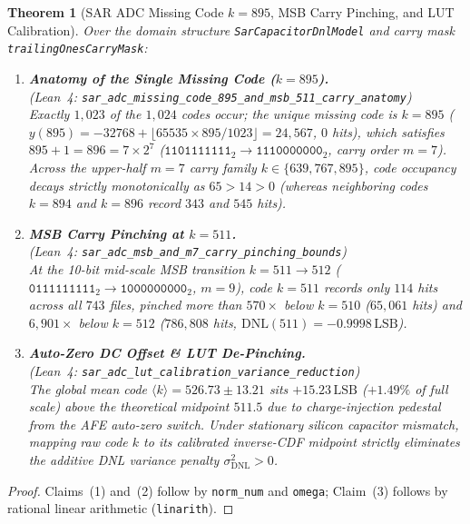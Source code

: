 \documentclass[11pt,letterpaper]{article}
\newcommand{\lean}[1]{\nolinkurl{#1}}
\newtheorem{theorem}{Theorem}[section]
\theoremstyle{definition}
\begin{document}
\begin{theorem}[SAR ADC Missing Code $k = 895$, MSB Carry Pinching, and LUT Calibration]\label{thm:pillar2}
Over the domain structure \lean{SarCapacitorDnlModel} and carry mask \lean{trailingOnesCarryMask}:
\begin{enumerate}
  \item \textbf{Anatomy of the Single Missing Code ($k = 895$).}\\
  (\emph{Lean~4:} \lean{sar_adc_missing_code_895_and_msb_511_carry_anatomy})\\
  Exactly $1{,}023$ of the $1{,}024$ codes occur; the unique missing code is $k = 895$ ($y(895) = -32768 + \lfloor 65535 \times 895 / 1023 \rfloor = 24{,}567$, $0$ hits), which satisfies $895 + 1 = 896 = 7 \times 2^7$ ($\mathtt{1101111111}_2 \to \mathtt{1110000000}_2$, carry order $m = 7$). Across the upper-half $m = 7$ carry family $k \in \{639, 767, 895\}$, code occupancy decays strictly monotonically as $65 > 14 > 0$ (whereas neighboring codes $k = 894$ and $k = 896$ record $343$ and $545$ hits).
  \item \textbf{MSB Carry Pinching at $k = 511$.}\\
  (\emph{Lean~4:} \lean{sar_adc_msb_and_m7_carry_pinching_bounds})\\
  At the 10-bit mid-scale MSB transition $k = 511 \to 512$ ($\mathtt{0111111111}_2 \to \mathtt{1000000000}_2$, $m = 9$), code $k = 511$ records only $114$ hits across all $743$ files, pinched more than $570\times$ below $k = 510$ ($65{,}061$ hits) and $6{,}901\times$ below $k = 512$ ($786{,}808$ hits, $\mathrm{DNL}(511) = -0.9998\,\text{LSB}$).
  \item \textbf{Auto-Zero DC Offset \& LUT De-Pinching.}\\
  (\emph{Lean~4:} \lean{sar_adc_lut_calibration_variance_reduction})\\
  The global mean code $\langle k \rangle = 526.73 \pm 13.21$ sits $+15.23\,\text{LSB}$ ($+1.49\%$ of full scale) above the theoretical midpoint $511.5$ due to charge-injection pedestal from the AFE auto-zero switch. Under stationary silicon capacitor mismatch, mapping raw code $k$ to its calibrated inverse-CDF midpoint strictly eliminates the additive DNL variance penalty $\sigma_{\mathrm{DNL}}^2 > 0$.
\end{enumerate}
\end{theorem}
\begin{proof}
Claims~(1) and~(2) follow by \texttt{norm\_num} and \texttt{omega}; Claim~(3) follows by rational linear arithmetic (\texttt{linarith}).
\end{proof}
\end{document}
